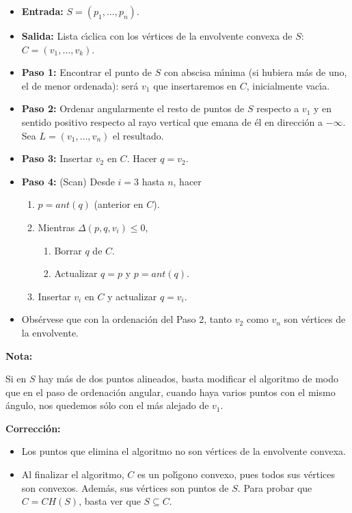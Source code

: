 \documentclass[twoside]{report}
\begin{document}
\begin{itemize}
  \item\textbf{Entrada:} $S=(p_1,\dots,p_n)$.
  \item\textbf{Salida:} Lista c\'{\i}clica con los v\'{e}rtices de la envolvente
convexa de $S$: $C=(v_1,\dots,v_k)$.
  \item\textbf{Paso 1:} Encontrar el punto de $S$ con abscisa m\'{\i}nima (si
hubiera m\'{a}s de uno, el de menor ordenada): ser\'{a} $v_1$ que
insertaremos en $C$, inicialmente vac\'{\i}a.
  \item\textbf{Paso 2:} Ordenar angularmente el resto de puntos de $S$
res\-pec\-to a $v_1$ y en sentido positivo respecto al rayo
vertical que emana de \'{e}l en direcci\'{o}n a $-\infty$. Sea
$L=(v_1,\dots,v_n)$ el resultado.
  \item\textbf{Paso 3:} Insertar $v_2$ en $C$. Hacer $q=v_2$.
  \item\textbf{Paso 4:} (Scan) Desde $i=3$ hasta $n$, hacer
\begin{enumerate}
  \item $p=ant(q)$ (anterior en $C$).
  \item Mientras $\Delta(p,q,v_i) \leq 0$,
\begin{enumerate}
  \item Borrar $q$ de $C$.
  \item Actualizar $q=p$ y $p=ant(q)$.
\end{enumerate}
  \item Insertar $v_i$ en $C$ y actualizar $q=v_i$.
\end{enumerate}
\end{itemize}

\begin{itemize}
  \item Obs\'{e}rvese que con la ordenaci\'{o}n del Paso 2, tanto $v_2$ como
$v_n$ son v\'{e}rtices de la envolvente.
\end{itemize}
\vspace{0.2cm}

{\bf Nota:}

Si en $S$ hay m\'{a}s de dos puntos alineados, basta
modificar el algoritmo de modo que en el paso de ordenaci\'{o}n
angular, cuando haya varios puntos con el mismo \'{a}ngulo, nos
quedemos s\'{o}lo con el m\'{a}s alejado de $v_1$.
\vspace{1cm}

{\bf Correcci\'{o}n:}

\begin{itemize}
  \item Los puntos que elimina el algoritmo no son v\'{e}rtices de la
envolvente convexa.
  \item Al finalizar el algoritmo, $C$ es un pol\'{\i}gono convexo, pues
todos sus v\'{e}rtices son convexos. Adem\'{a}s, sus v\'{e}rtices son puntos
de $S$. Para probar que $C=CH(S)$, basta ver que $S \subseteq C$.
\end{itemize}
\end{document}
